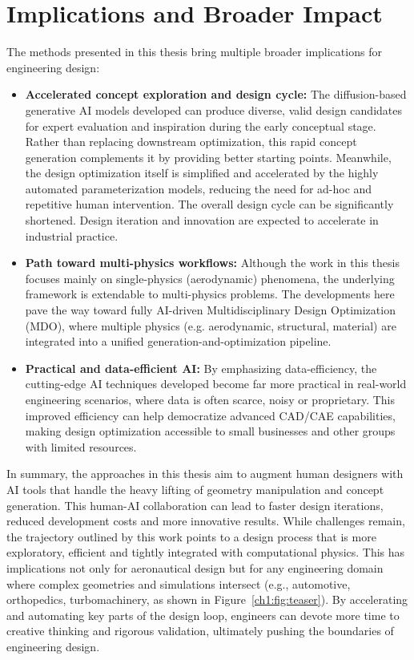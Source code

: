 \section{Implications and Broader Impact}
The methods presented in this thesis bring multiple broader implications for engineering design:
\begin{itemize}
    \item \textbf{Accelerated concept exploration and design cycle:} The diffusion-based generative AI models developed can produce diverse, valid design candidates for expert evaluation and inspiration during the early conceptual stage. Rather than replacing downstream optimization, this rapid concept generation complements it by providing better starting points. Meanwhile, the design optimization itself is simplified and accelerated by the highly automated parameterization models, reducing the need for ad-hoc and repetitive human intervention. The overall design cycle can be significantly shortened. Design iteration and innovation are expected to accelerate in industrial practice.

    \item \textbf{Path toward multi-physics workflows:} Although the work in this thesis focuses mainly on single-physics (aerodynamic) phenomena, the underlying framework is extendable to multi-physics problems. The developments here pave the way toward fully AI-driven Multidisciplinary Design Optimization (MDO), where multiple physics (e.g. aerodynamic, structural, material) are integrated into a unified generation-and-optimization pipeline.

    \item \textbf{Practical and data-efficient AI:} By emphasizing data-efficiency, the cutting-edge AI techniques developed become far more practical in real-world engineering scenarios, where data is often scarce, noisy or proprietary. This improved efficiency can help democratize advanced CAD/CAE capabilities, making design optimization accessible to small businesses and other groups with limited resources.
\end{itemize}

In summary, the approaches in this thesis aim to augment human designers with AI tools that handle the heavy lifting of geometry manipulation and concept generation. This human-AI collaboration can lead to faster design iterations, reduced development costs and more innovative results. While challenges remain, the trajectory outlined by this work points to a design process that is more exploratory, efficient and tightly integrated with computational physics. This has implications not only for aeronautical design but for any engineering domain where complex geometries and simulations intersect (e.g., automotive, orthopedics, turbomachinery, as shown in Figure~\ref{ch1:fig:teaser}). By accelerating and automating key parts of the design loop, engineers can devote more time to creative thinking and rigorous validation, ultimately pushing the boundaries of engineering design.

